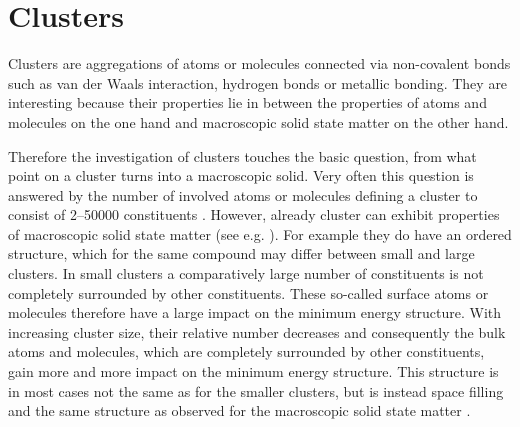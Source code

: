 \chapter{Clusters}

Clusters are aggregations of atoms or molecules connected via non-covalent
bonds such as van der Waals interaction, hydrogen bonds or metallic bonding.
They are interesting
because their properties lie in between the properties of
atoms and molecules on the one hand and macroscopic solid state matter
on the other hand.

Therefore the investigation of clusters touches the basic question, from what point
on a cluster turns into a macroscopic solid.
Very often this question is answered by the number of involved atoms or molecules
defining a cluster to consist of 2--50000 constituents \cite{Bjorneholm09}.
However, already cluster can exhibit properties of macroscopic solid
state matter (see e.g. \cite{Foerstel10}).
For example they do have an ordered structure, which for the same
compound may differ between small and large clusters. In small clusters a
comparatively large number of constituents is not completely surrounded
by other constituents. These so-called surface atoms or molecules therefore
have a large impact on the minimum energy structure. With increasing cluster
size, their relative number decreases and consequently the bulk atoms and molecules,
which are completely surrounded by other constituents,
gain more and more impact on the minimum energy structure. This structure is
in most cases not the same as for the smaller clusters, but is instead
space filling and the
same structure as observed for the macroscopic solid state matter
\cite{Martin96,Hartke02}.

